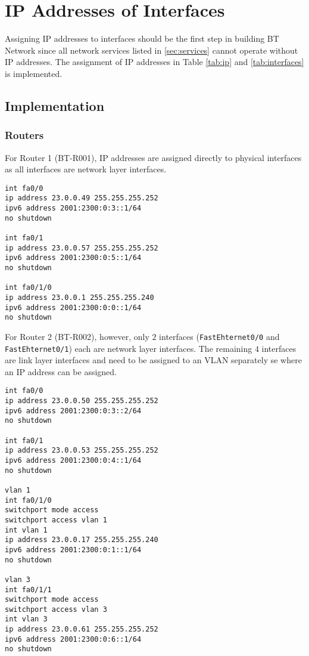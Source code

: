 \section{IP Addresses of Interfaces}
\label{sec:IP}


Assigning IP addresses to interfaces should be the first step in building BT Network since all network services listed in \ref{sec:services} cannot operate without IP addresses.
The assignment of IP addresses in Table \ref{tab:ip} and \ref{tab:interfaces} is implemented.

\subsection{Implementation}

\subsubsection{Routers}

For Router 1 (BT-R001), IP addresses are assigned directly to physical interfaces as all interfaces are network layer interfaces.

\begin{lstlisting}
int fa0/0
ip address 23.0.0.49 255.255.255.252
ipv6 address 2001:2300:0:3::1/64
no shutdown

int fa0/1
ip address 23.0.0.57 255.255.255.252
ipv6 address 2001:2300:0:5::1/64
no shutdown

int fa0/1/0
ip address 23.0.0.1 255.255.255.240
ipv6 address 2001:2300:0:0::1/64
no shutdown
\end{lstlisting}

For Router 2 (BT-R002), however, only $2$ interfaces (\texttt{FastEhternet0/0} and \texttt{FastEhternet0/1}) each are network layer interfaces. The remaining $4$ interfaces are link layer interfaces and need to be assigned to an VLAN separately se where an IP address can be assigned. 

\begin{lstlisting}
int fa0/0
ip address 23.0.0.50 255.255.255.252
ipv6 address 2001:2300:0:3::2/64
no shutdown

int fa0/1
ip address 23.0.0.53 255.255.255.252
ipv6 address 2001:2300:0:4::1/64
no shutdown

vlan 1
int fa0/1/0
switchport mode access
switchport access vlan 1
int vlan 1
ip address 23.0.0.17 255.255.255.240
ipv6 address 2001:2300:0:1::1/64
no shutdown

vlan 3
int fa0/1/1
switchport mode access
switchport access vlan 3
int vlan 3
ip address 23.0.0.61 255.255.255.252
ipv6 address 2001:2300:0:6::1/64
no shutdown
\end{lstlisting}

